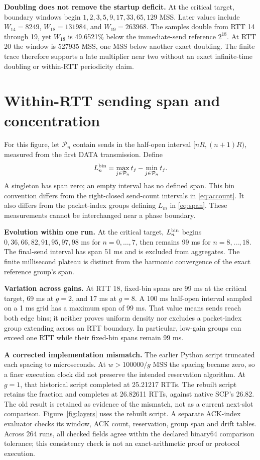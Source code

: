 \documentclass[sigconf,nonacm]{acmart}
\begin{document}
\textbf{Doubling does not remove the startup deficit.} At the critical target, boundary windows begin $1,2,3,5,9,17,33,65,129$ MSS. Later values include $W_{14}=8249$, $W_{18}=131984$, and $W_{19}=263968$. The samples double from RTT 14 through 19, yet $W_{18}$ is 49.6521\% below the immediate-send reference $2^{18}$. At RTT 20 the window is 527935 MSS, one MSS below another exact doubling. The finite trace therefore supports a late multiplier near two without an exact infinite-time doubling or within-RTT periodicity claim.

\section{Within-RTT sending span and concentration}

For this figure, let $\mathcal{P}_n$ contain sends in the half-open interval $[nR,(n+1)R)$, measured from the first DATA transmission. Define
\begin{equation}
 L_n^{\rm bin}=\max_{j\in\mathcal{P}_n}t_j-\min_{j\in\mathcal{P}_n}t_j.
\end{equation}
A singleton has span zero; an empty interval has no defined span. This bin convention differs from the right-closed send-count intervals in \eqref{eq:account}. It also differs from the packet-index groups defining $L_m$ in \eqref{eq:span}. These measurements cannot be interchanged near a phase boundary.

\textbf{Evolution within one run.} At the critical target, $L_n^{\rm bin}$ begins $0,36,66,82,91,95,97,98$ ms for $n=0,\ldots,7$, then remains 99 ms for $n=8,\ldots,18$. The final-send interval has span 51 ms and is excluded from aggregates. The finite millisecond plateau is distinct from the harmonic convergence of the exact reference group's span.

\textbf{Variation across gains.} At RTT 18, fixed-bin spans are 99 ms at the critical target, 69 ms at $g=2$, and 17 ms at $g=8$. A 100 ms half-open interval sampled on a 1 ms grid has a maximum span of 99 ms. That value means sends reach both edge bins; it neither proves uniform density nor excludes a packet-index group extending across an RTT boundary. In particular, low-gain groups can exceed one RTT while their fixed-bin spans remain 99 ms.

\textbf{A corrected implementation mismatch.} The earlier Python script truncated each spacing to microseconds. At $w>100000/g$ MSS the spacing became zero, so a finer execution clock did not preserve the intended reservation algorithm. At $g=1$, that historical script completed at 25.21217 RTTs. The rebuilt script retains the fraction and completes at 26.82611 RTTs, against native SCP's 26.82. The old result is retained as evidence of the mismatch, not as a current next-slot comparison. Figure~\ref{fig:layers} uses the rebuilt script. A separate ACK-index evaluator checks its window, ACK count, reservation, group span and drift tables. Across 264 runs, all checked fields agree within the declared binary64 comparison tolerance; this consistency check is not an exact-arithmetic proof or protocol execution.
\end{document}
